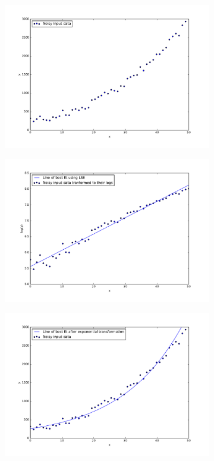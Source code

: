 \begin{figure}[!h]
  \centering
    \begin{subfigure}{0.32\textwidth}
        \centering
        \includegraphics[width=\linewidth]{figures/regression_log_example_1.pdf}
    \end{subfigure}
  \begin{subfigure}{.32\textwidth}
        \centering
        \includegraphics[width=\linewidth]{figures/regression_log_example_2.pdf}
    \end{subfigure}
    \begin{subfigure}{0.32\textwidth}
        \centering
        \includegraphics[width=\linewidth]{figures/regression_log_example_3.pdf}

\end{subfigure}
\end{figure}
